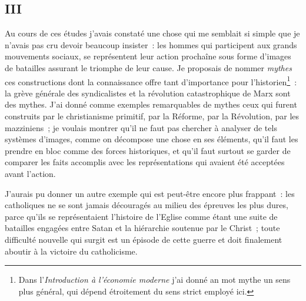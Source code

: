 \documentclass[french,twoside]{book} %
\begin{document}
\subsection[{III}]{III}
\noindent Au cours de ces études j’avais constaté une chose qui me semblait si simple que je n’avais pas cru devoir beaucoup insister : les hommes qui participent aux grands mouvements sociaux, se représentent leur action prochaîne  sous forme d’images de batailles assurant le triomphe de leur cause. Je proposais de nommer \emph{mythes} ces constructions dont la connaissance offre tant d’importance pour l’historien\footnote{ \noindent Dans l’\emph{Introduction à l’économie moderne} j’ai donné an mot mythe un sens plus général, qui dépend étroitement du sens strict employé ici.
 } : la grève générale des syndicalistes et la révolution catastrophique de Marx sont des mythes. J’ai donné comme exemples remarquables de mythes ceux qui furent construits par le christianisme primitif, par la Réforme, par la Révolution, par les mazziniens ; je voulais montrer qu’il ne faut pas chercher à analyser de tels systèmes d’images, comme on décompose une chose en ses éléments, qu’il faut les prendre en bloc comme des forces historiques, et qu’il faut surtout se garder de comparer les faits accomplis avec les représentations qui avaient été acceptées avant l’action.\par
J’aurais pu donner un autre exemple qui est peut-être encore plus frappant : les catholiques ne se sont jamais découragés au milieu des épreuves les plus dures, parce qu’ils se représentaient l’histoire de l’Eglise comme étant une suite de batailles engagées entre Satan et la hiérarchie soutenue par le Christ ; toute difficulté nouvelle qui surgit est un épisode de cette guerre et doit finalement aboutir à la victoire du catholicisme.\par
\end{document}
